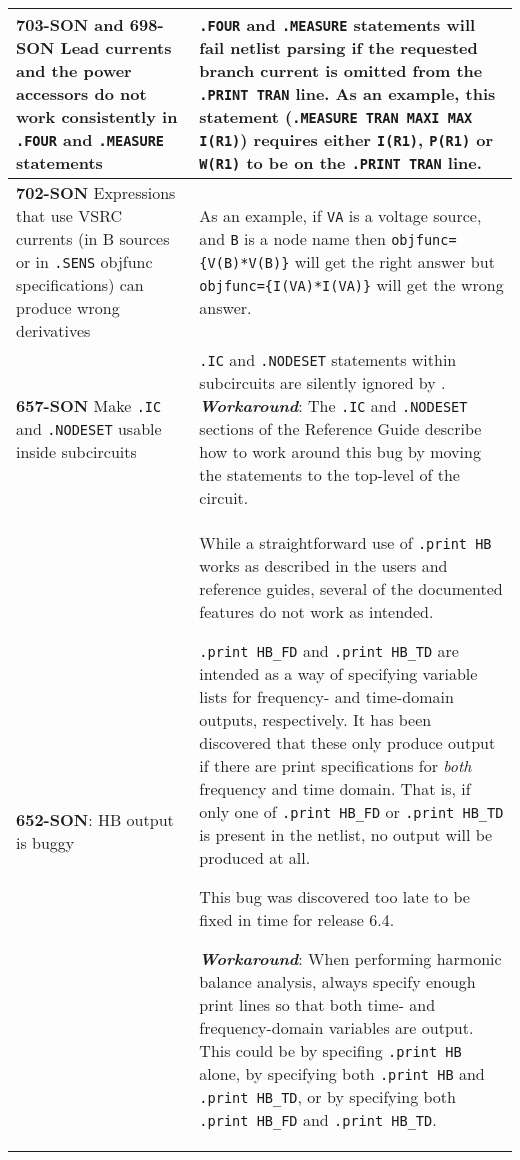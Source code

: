 {\begin{longtable}[h] {>{\raggedright\small}m{2in}|>{\raggedright\let\\\tabularnewline\small}m{3.5in}}
\textbf{703-SON and 698-SON} Lead currents and the power accessors do
not work consistently in \texttt{.FOUR} and \texttt{.MEASURE} statements &
\texttt{.FOUR} and \texttt{.MEASURE} statements will fail netlist parsing if 
the requested branch current is omitted from the \texttt{.PRINT TRAN} line. 
As an example, this statement (\texttt{.MEASURE TRAN MAXI MAX I(R1)}) requires
either \texttt{I(R1)}, \texttt{P(R1)} or \texttt{W(R1)} to be on the 
\texttt{.PRINT TRAN} line.
\\ \hline 

\textbf{702-SON}  Expressions that use VSRC currents (in B sources or in \texttt{.SENS} objfunc 
specifications) can produce wrong derivatives &  As an example, if \texttt{VA} is a voltage source,
and \texttt{B} is a node name then \texttt{objfunc=\{V(B)*V(B)\}} will get the 
right answer but \texttt{objfunc=\{I(VA)*I(VA)\}} will get the wrong answer. 
\\ \hline

\textbf{657-SON} Make \texttt{.IC} and \texttt{.NODESET} usable inside subcircuits & 
\texttt{.IC} and \texttt{.NODESET} statements within subcircuits are
silently ignored by \Xyce{}. \textbf{\textit{Workaround}}: The \texttt{.IC}
and \texttt{.NODESET} sections of the \Xyce{} Reference Guide describe how to
work around this bug by moving the statements to the top-level of the
circuit.
\\ \hline

\textbf{652-SON}: HB output is buggy & While a straightforward use of \texttt{.print HB} works as described in the users and reference guides, several of the documented features do not work as intended.

\texttt{.print HB\_FD} and \texttt{.print HB\_TD} are intended as a way of specifying variable lists for frequency- and time-domain outputs, respectively.  It has been discovered that these only produce output if there are print specifications for {\em both\/} frequency and time domain.  That is, if only one of \texttt{.print HB\_FD} or \texttt{.print HB\_TD} is present in the netlist, no output will be produced at all.   

This bug was discovered too late to be fixed in time for release 6.4.

\textbf{\textit{Workaround}}: When performing harmonic balance analysis, always specify enough print lines so that both time- and frequency-domain variables are output.  This could be by specifing \texttt{.print HB} alone, by specifying both \texttt{.print HB} and \texttt{.print HB\_TD}, or by specifying both \texttt{.print HB\_FD} and \texttt{.print HB\_TD}.
\\ \hline



\end{longtable}}
